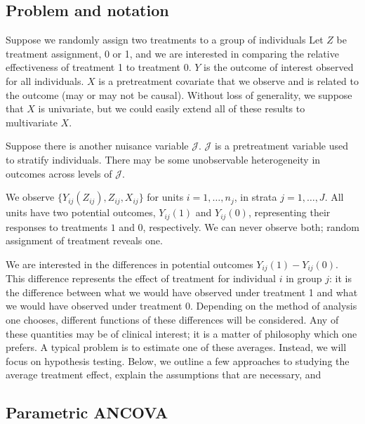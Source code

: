 \documentclass[11pt]{article}
\begin{document}

\subsection{Problem and notation}
Suppose we randomly assign two treatments to a group of individuals
Let $Z$ be treatment assignment, 0 or 1, and we are interested in comparing the relative effectiveness of treatment 1 to treatment 0.
$Y$ is the outcome of interest observed for all individuals.
$X$ is a pretreatment covariate that we observe and is related to the outcome (may or may not be causal).  
Without loss of generality, we suppose that $X$ is univariate, but we could easily extend all of these results to multivariate $X$.

Suppose there is another nuisance variable $\mathcal{J}$. 
$\mathcal{J}$ is a pretreatment variable used to stratify individuals. 
There may be some unobservable heterogeneity in outcomes across levels of $\mathcal{J}$.

We observe $\{Y_{ij}(Z_{ij}), Z_{ij}, X_{ij}\}$ for units $i = 1, \dots, n_j$, in strata $j = 1, \dots, J$.
All units have two potential outcomes, $Y_{ij}(1)$ and $Y_{ij}(0)$, representing their responses to treatments $1$ and $0$, respectively.
We can never observe both; random assignment of treatment reveals one.

We are interested in the differences in potential outcomes $Y_{ij}(1) - Y_{ij}(0)$.
This difference represents the effect of treatment for individual $i$ in group $j$: it is the difference between what we would have observed under treatment 1 and what we would have observed under treatment $0$.
Depending on the method of analysis one chooses, different functions of these differences will be considered.
Any of these quantities may be of clinical interest; it is a matter of philosophy which one prefers.
A typical problem is to estimate one of these averages.
Instead, we will focus on hypothesis testing.
Below, we outline a few approaches to studying the average treatment effect, explain the assumptions that are necessary, and 

\subsection{Parametric ANCOVA}
\end{document}
